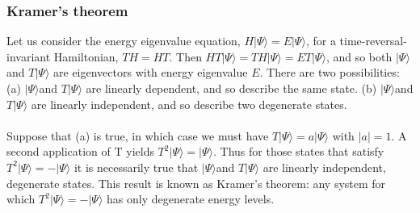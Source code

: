 \subsubsection{Kramer's theorem}
Let us consider the energy eigenvalue equation, $H|\Psi\rangle = E|\Psi\rangle$, for a time-reversal-invariant Hamiltonian, $TH=HT$. 
Then $HT|\Psi\rangle =  TH|\Psi\rangle = ET|\Psi\rangle$, and so
both $|\Psi\rangle$ and $T|\Psi\rangle$ are eigenvectors with energy eigenvalue $E$. 
There are two possibilities: 
(a) $|\Psi\rangle$and $T|\Psi\rangle$ are linearly dependent, and so describe the same state.
(b) $|\Psi\rangle$and $T|\Psi\rangle$ are linearly independent,
and so describe two degenerate states.
\\ \\
Suppose that (a) is true, in which case we must have $T|\Psi\rangle = a|\Psi\rangle$ with $|a|=1$. A second application of T yields $T^2|\Psi\rangle = |\Psi\rangle$. 
Thus for those states that satisfy $T^2|\Psi\rangle = -|\Psi\rangle$ it is necessarily true that $|\Psi\rangle$and $T|\Psi\rangle$ are linearly independent, degenerate states. This result is known as Kramer's theorem: any
system for which $T^2|\Psi\rangle = -|\Psi\rangle$ has only degenerate energy levels.